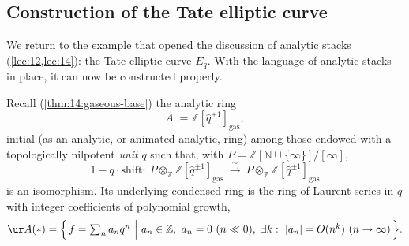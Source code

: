 \subsection{Construction of the Tate elliptic curve}
\label{subsec:19:tate}

We return to the example that opened the discussion of analytic stacks
(\cref{lec:12,lec:14}): the Tate elliptic curve $E_q$. With the language of
analytic stacks in place, it can now be constructed properly.

\begin{remark}
\label{rmk:19:gaseous-base}
Recall (\cref{thm:14:gaseous-base}) the analytic ring
\begin{equation*}
A:=\mathbb Z[\widehat q^{\pm1}]_{\mathrm{gas}},
\end{equation*}
initial (as an analytic, or animated analytic, ring) among those endowed with a
topologically nilpotent \emph{unit} $q$ such that, with
$P=\mathbb Z[\mathbb N\cup\{\infty\}]/[\infty]$,
\begin{equation*}
1-q\cdot\mathrm{shift}\colon\ P\otimes_{\mathbb Z}\mathbb Z[\widehat q^{\pm1}]_{\mathrm{gas}}
\ \xrightarrow{\ \sim\ }\ P\otimes_{\mathbb Z}\mathbb Z[\widehat q^{\pm1}]_{\mathrm{gas}}
\end{equation*}
is an isomorphism. Its underlying condensed ring is the ring of Laurent series in
$q$ with integer coefficients of polynomial growth,
\begin{equation*}
\ur A(\ast)=\Bigl\{\,f=\textstyle\sum_{n} a_n q^{n}\ \Big|\ a_n\in\mathbb Z,\
a_n=0\ (n\ll0),\ \exists k:\ |a_n|=O(n^{k})\ (n\to\infty)\,\Bigr\}.
\end{equation*}
\end{remark}

